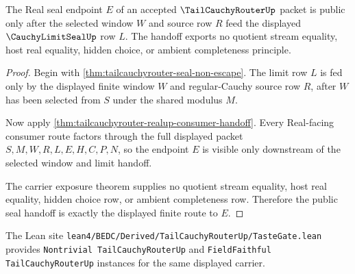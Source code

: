 \begin{theorem}
\label{thm:tail-cauchy-router-real-seal-handoff}
The Real seal endpoint $E$ of an accepted $\TailCauchyRouterUp$ packet is public only after the selected window $W$ and source row $R$ feed the displayed $\CauchyLimitSealUp$ row $L$. The handoff exports no quotient stream equality, host real equality, hidden choice, or ambient completeness principle.
\end{theorem}
\begin{proof}
Begin with \autoref{thm:tailcauchyrouter-seal-non-escape}. The limit row $L$ is fed only by the displayed finite window $W$ and regular-Cauchy source row $R$, after $W$ has been selected from $S$ under the shared modulus $M$.

Now apply \autoref{thm:tailcauchyrouter-realup-consumer-handoff}. Every Real-facing consumer route factors through the full displayed packet $S,M,W,R,L,E,H,C,P,N$, so the endpoint $E$ is visible only downstream of the selected window and limit handoff.

The carrier exposure theorem supplies no quotient stream equality, host real equality, hidden choice row, or ambient completeness row. Therefore the public seal handoff is exactly the displayed finite route to $E$.
\end{proof}



The Lean site \texttt{lean4/BEDC/Derived/TailCauchyRouterUp/TasteGate.lean} provides \texttt{Nontrivial TailCauchyRouterUp} and \texttt{FieldFaithful TailCauchyRouterUp} instances for the same displayed carrier.


